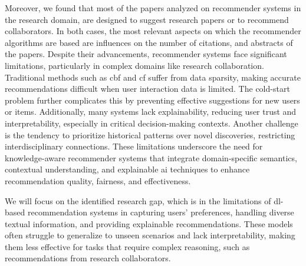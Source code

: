 Moreover, we found that most of the papers analyzed on recommender systems in the research domain, are designed to suggest research papers or to recommend collaborators.
In both cases, the most relevant aspects on which the recommender algorithms are based are influences on the number of citations, and abstracts of the papers.
Despite their advancements, recommender systems face significant limitations, particularly in complex domains like research collaboration.
Traditional methods such as \gls{cbf} and \gls{cf} suffer from data sparsity, making accurate recommendations difficult when user interaction data is limited.
The cold-start problem further complicates this by preventing effective suggestions for new users or items.
Additionally, many systems lack explainability, reducing user trust and interpretability, especially in critical decision-making contexts.
Another challenge is the tendency to prioritize historical patterns over novel discoveries, restricting interdisciplinary connections.
These limitations underscore the need for knowledge-aware recommender systems that integrate domain-specific semantics, contextual understanding, and explainable \gls{ai} techniques to enhance recommendation quality, fairness, and effectiveness.

We will focus on the identified research gap, which is in the limitations of \gls{dl}-based recommendation systems in capturing users' preferences, handling diverse textual information, and providing explainable recommendations.
These models often struggle to generalize to unseen scenarios and lack interpretability, making them less effective for tasks that require complex reasoning, such as recommendations from research collaborators.

